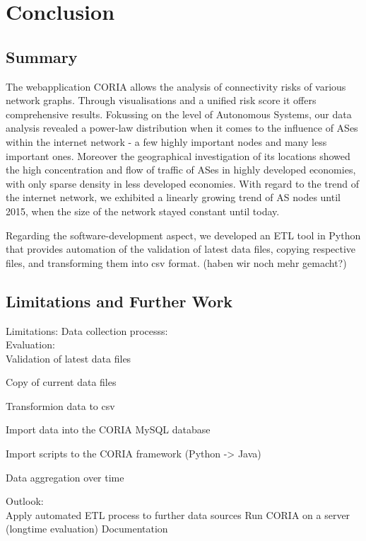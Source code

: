 \documentclass[conference]{IEEEtran}
\begin{document}
\section{Conclusion} %
\subsection{Summary}

The webapplication CORIA allows the analysis of connectivity risks of various network graphs. Through visualisations and a unified risk score it offers comprehensive results. Fokussing on the level of Autonomous Systems, our data analysis revealed a power-law distribution when it comes to the influence of ASes within the internet network - a few highly important nodes and many less important ones. Moreover the geographical investigation of its locations showed the high concentration and flow of traffic of ASes in highly developed economies, with only sparse density in less developed economies. With regard to the trend of the internet network, we exhibited a linearly growing trend of AS nodes until 2015, when the size of the network stayed constant until today.

Regarding the software-development aspect, we developed an ETL tool in Python that provides automation of the validation of latest data files, copying respective files, and transforming them into csv format.  (haben wir noch mehr gemacht?)

 

\subsection{Limitations and Further Work}

Limitations: Data collection processs: \\



Evaluation: \\
Validation of latest data files

Copy of current data files

Transformion data to csv

Import data into the CORIA MySQL database

Import scripts to the CORIA framework (Python -> Java)

Data aggregation over time

Outlook:\\
Apply automated ETL process to further data sources
Run CORIA on a server (longtime evaluation)
Documentation
\end{document}
